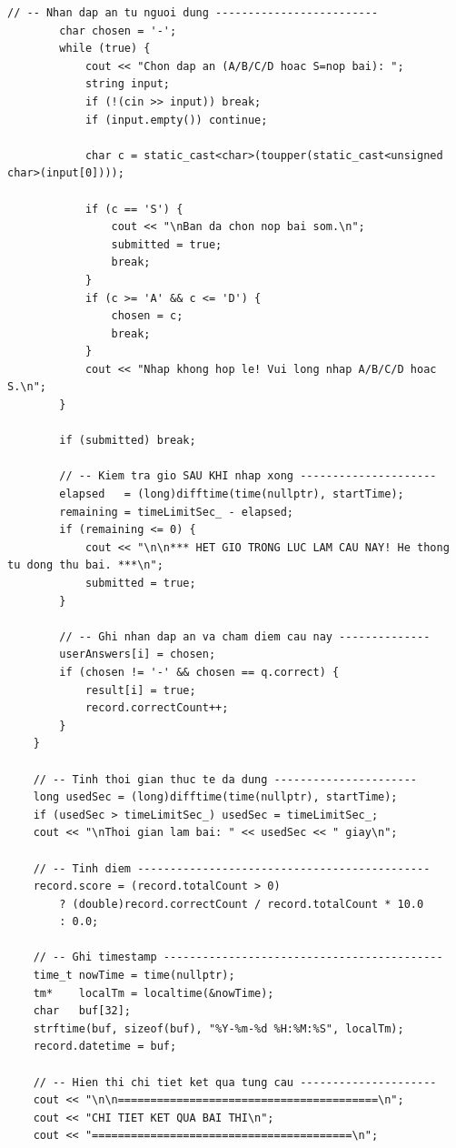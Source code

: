 \documentclass[11pt]{report}
\begin{document}
\begin{lstlisting}[caption={Exam.cpp -- Cài đặt logic sinh đề, xáo trộn, bộ đếm giờ}, label={lst:full_exam_cpp}]
        // -- Nhan dap an tu nguoi dung -------------------------
        char chosen = '-';
        while (true) {
            cout << "Chon dap an (A/B/C/D hoac S=nop bai): ";
            string input;
            if (!(cin >> input)) break;
            if (input.empty()) continue;

            char c = static_cast<char>(toupper(static_cast<unsigned char>(input[0])));

            if (c == 'S') {
                cout << "\nBan da chon nop bai som.\n";
                submitted = true;
                break;
            }
            if (c >= 'A' && c <= 'D') {
                chosen = c;
                break;
            }
            cout << "Nhap khong hop le! Vui long nhap A/B/C/D hoac S.\n";
        }

        if (submitted) break;

        // -- Kiem tra gio SAU KHI nhap xong ---------------------
        elapsed   = (long)difftime(time(nullptr), startTime);
        remaining = timeLimitSec_ - elapsed;
        if (remaining <= 0) {
            cout << "\n\n*** HET GIO TRONG LUC LAM CAU NAY! He thong tu dong thu bai. ***\n";
            submitted = true;
        }

        // -- Ghi nhan dap an va cham diem cau nay --------------
        userAnswers[i] = chosen;
        if (chosen != '-' && chosen == q.correct) {
            result[i] = true;
            record.correctCount++;
        }
    }

    // -- Tinh thoi gian thuc te da dung ----------------------
    long usedSec = (long)difftime(time(nullptr), startTime);
    if (usedSec > timeLimitSec_) usedSec = timeLimitSec_;
    cout << "\nThoi gian lam bai: " << usedSec << " giay\n";

    // -- Tinh diem ---------------------------------------------
    record.score = (record.totalCount > 0)
        ? (double)record.correctCount / record.totalCount * 10.0
        : 0.0;

    // -- Ghi timestamp -------------------------------------------
    time_t nowTime = time(nullptr);
    tm*    localTm = localtime(&nowTime);
    char   buf[32];
    strftime(buf, sizeof(buf), "%Y-%m-%d %H:%M:%S", localTm);
    record.datetime = buf;

    // -- Hien thi chi tiet ket qua tung cau ---------------------
    cout << "\n\n========================================\n";
    cout << "CHI TIET KET QUA BAI THI\n";
    cout << "========================================\n";


\end{lstlisting}
\end{document}
